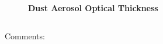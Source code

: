 \documentclass[aspectratio=169, 10pt]{beamer}
\begin{document}
\begin{frame}
\begin{columns}
\begin{column}{0.5\textwidth}
\vspace{-1.4cm}
\begin{figure}
\textbf{Dust Aerosol Optical Thickness} \\
\end{figure}

\end{column}
\end{columns}
\vspace{.2cm}
Comments:

\end{frame}
\end{document}
